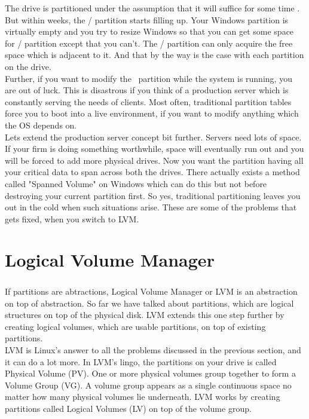 The drive is partitioned under the assumption that it will suffice for some time
. But within weeks, the / partition starts filling up. Your Windows partition
is virtually empty and you try to resize Windows so that you can get some space
for / partition except that you can't. The / partition can only acquire the
free space which is adjacent to it. And that by the way is the case with each
partition on the drive.\\

Further, if you want to modify the \ partition while the system is running, you
are out of luck. This is disastrous if you think of a production server which is
constantly serving the needs of clients. Most often, traditional partition
tables force you to boot into a live environment, if you want to modify anything
which the OS depends on.\\

Lets extend the production server concept bit further. Servers need lots of
space. If your firm is doing something worthwhile, space will eventually run out
and you will be forced to add more physical drives. Now you want the partition
having all your critical data to span across both the drives. There actually
exists a method called "Spanned Volume" on Windows which can do this but not
before destroying your current partition first. So yes, traditional partitioning
leaves you out in the cold when such situations arise. These are some of the
problems that gets fixed, when you switch to LVM.


\chapter{Logical Volume Manager}
\paragraph{}
If partitions are abtractions, Logical Volume Manager or LVM is an abstraction
on top of abstraction. So far we have talked about partitions, which are logical
structures on top of the physical disk. LVM extends this one step further by
creating logical volumes, which are usable partitions, on top of existing
partitions.\\

LVM is Linux's answer to all the problems discussed in the previous section, and
it can do a lot more. In LVM's lingo, the partitions on your drive is called
Physical Volume (PV). One or more physical volumes group together to form a
Volume Group (VG). A volume group appears as a single continuous space no matter
how many physical volumes lie underneath. LVM works by creating partitions
called Logical Volumes (LV) on top of the volume group.\\

